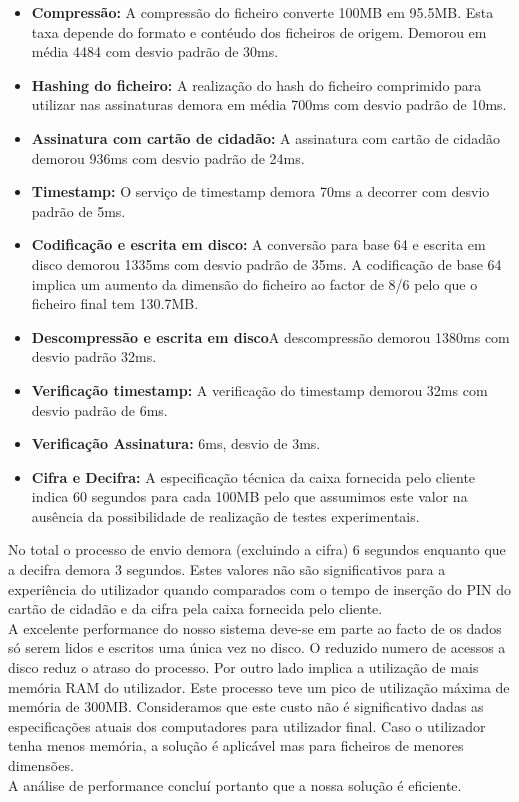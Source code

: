 \begin{itemize}
  \item \textbf{Compressão: }A compressão do ficheiro converte 100MB em 95.5MB. Esta taxa depende do formato e contéudo dos ficheiros de origem. Demorou em média 4484 com desvio padrão de 30ms. \\
  \item \textbf{Hashing do ficheiro: } A realização do hash do ficheiro comprimido para utilizar nas assinaturas demora em média 700ms com desvio padrão de 10ms.\\
  \item \textbf{Assinatura com cartão de cidadão: }A assinatura com cartão de cidadão demorou 936ms com desvio padrão de 24ms. 
 \item \textbf{Timestamp: }O serviço de timestamp demora 70ms a decorrer com desvio padrão de 5ms.\\
\item \textbf{Codificação e escrita em disco: }A conversão para base 64 e escrita em disco demorou 1335ms com desvio padrão de 35ms. A codificação de base 64 implica um aumento da dimensão do ficheiro ao factor de 8/6 pelo que o ficheiro final tem 130.7MB.
\item  \textbf{Descompressão e escrita em disco}A descompressão demorou 1380ms com desvio padrão 32ms.\\
\item \textbf{Verificação timestamp: }A verificação do timestamp demorou 32ms com desvio padrão de 6ms.
\item  \textbf{Verificação Assinatura: } 6ms, desvio de 3ms.\\
\item \textbf{Cifra e Decifra: } A especificação técnica da caixa fornecida pelo 
cliente indica 60 segundos para cada 100MB pelo que assumimos este valor na 
ausência da possibilidade de realização de testes experimentais.
\end{itemize}
No total o processo de envio demora (excluindo a cifra) 6 segundos enquanto que 
a decifra demora 3 segundos. Estes valores não são significativos para a 
experiência do utilizador quando comparados com o tempo de inserção do PIN do 
cartão de cidadão e da cifra pela caixa fornecida pelo cliente.\\
A excelente performance do nosso sistema deve-se em parte ao facto de os dados só serem lidos e escritos uma única vez no disco. 
O reduzido numero de acessos a disco reduz o atraso do processo. Por outro lado implica a utilização de mais memória RAM do utilizador. Este processo teve um pico de utilização máxima de memória de 300MB. Consideramos que este custo não é significativo dadas as especificações atuais dos computadores para utilizador final. Caso o utilizador tenha menos memória, a solução é aplicável mas  para ficheiros de menores dimensões.\\
A análise de performance concluí portanto que a nossa solução é eficiente.\\

